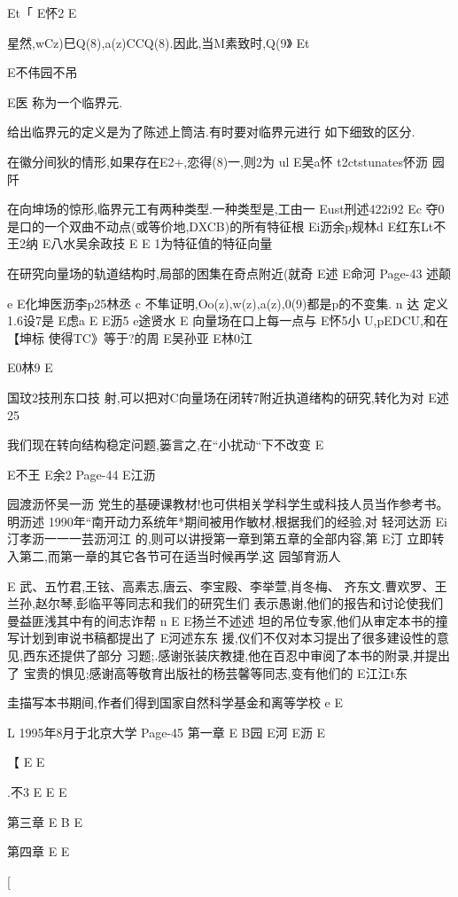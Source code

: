 Et「
E怀2
E

星然,wCz)巳Q(8),a(z)CCQ(8).因此,当M素致时,Q(9》
Et

E不伟园不吊

E医
称为一个临界元.

给出临界元的定义是为了陈述上筒洁.有时要对临界元进行
如下细致的区分.

在徽分间狄的情形,如果存在E2+,恋得(8)一,则2为
ul
E吴a怀
t2ctstunates怀沥
园阡

在向坤场的惊形,临界元工有两种类型.一种类型是,工由一
Eust刑述422i92
Ec
夺0是口的一个双曲不动点(或等价地,DXCB)的所有特征根
Ei沥余p规林d
E红东Lt不王2纳
E八水吴余政技
E
E
1为特征值的特征向量

在研究向量场的轨道结构时,局部的困集在奇点附近(就奇
E述
E命河
Page-43
述颠

e
E化坤医沥李p25林丞
c
不隼证明,Oo(z),w(z),a(z),0(9)都是p的不变集.
n
达
定义1.6设7是
E虑a
E
E沥5
e途贤水
E
向量场在口上每一点与
E怀5小
U,pEDCU,和在
【坤标
使得TC》等于?的周
E吴孙亚
E林0江

E0林9
E

国玟2技刑东口技
射,可以把对C向量场在闭转7附近执道绪构的研究,转化为对
E述25

我们现在转向结构稳定问题,篓言之,在“小扰动“下不改变
E

E不王
E余2
Page-44
E江沥

园渡沥怀吴一沥
党生的基硬课教材!也可供相关学科学生或科技人员当作参考书。
明沥述
1990年“南开动力系统年*期间被用作敏材,根据我们的经验,对
轻河达沥
Ei汀孝沥一一一芸沥河江
的,则可以讲授第一章到第五章的全部内容,第
E汀
立即转入第二,而第一章的其它各节可在适当时候再学,这
园邹育沥人

E
武、五竹君,王铉、高素志,唐云、李宝殿、李举萱,肖冬梅、
齐东文.曹欢罗、王兰孙,赵尔琴,彭临平等同志和我们的研究生们
表示愚谢,他们的报告和讨论使我们曼益匪浅其中有的间志诈帮
n
E
E扬兰不述述
坦的吊位专家,他们从审定本书的撞写计划到审说书稿都提出了
E河述东东
援,仪们不仅对本习提出了很多建设性的意见,西东还提供了部分
习题;.感谢张装庆教捷,他在百忍中审阅了本书的附录,并提出了
宝贵的惧见;感谢高等敬育出版社的杨芸馨等同志,变有他们的
E江江t东

圭描写本书期间,作者们得到国家自然科学基金和离等学校
e
E

L
1995年8月于北京大学
Page-45
第一章
E
B园
E河
E沥
E

【
E
E

.不3
E
E
E

第三章
E
B
E

第四章
E
E

[


